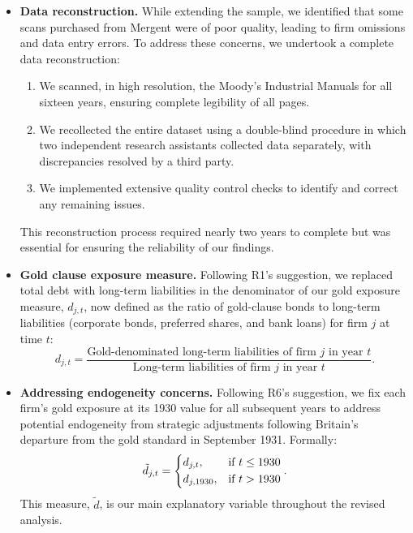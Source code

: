 \begin{itemize}
\item \textbf{Data reconstruction.} While extending the sample, we identified that some scans purchased from Mergent were of poor quality, leading to firm omissions and data entry errors. To address these concerns, we undertook a complete data reconstruction:
\begin{enumerate}
    \item We scanned, in high resolution, the Moody's Industrial Manuals for all sixteen years, ensuring complete legibility of all pages.
    \item We recollected the entire dataset using a double-blind procedure in which two independent research assistants collected data separately, with discrepancies resolved by a third party.
    \item We implemented extensive quality control checks to identify and correct any remaining issues.
\end{enumerate}
This reconstruction process required nearly two years to complete but was essential for ensuring the reliability of our findings.

\item \textbf{Gold clause exposure measure.} 
Following R1's suggestion, we replaced total debt with long-term liabilities in the denominator of our gold exposure measure, $d_{j,t}$, now defined as the ratio of gold-clause bonds to long-term liabilities (corporate bonds, preferred shares, and bank loans) for firm $j$ at time $t$:
\begin{equation*}
d_{j,t} = \frac{\text{Gold-denominated long-term liabilities of firm $j$ in year $t$}}{\text{Long-term liabilities of firm $j$ in year $t$}}.
\end{equation*}

\item \textbf{Addressing endogeneity concerns.} Following R6's suggestion, we fix each firm's gold exposure at its 1930 value for all subsequent years to address potential endogeneity from strategic adjustments following Britain's departure from the gold standard in September 1931. Formally:
\begin{equation*}
\tilde{d}_{j,t} = \begin{dcases}
d_{j,t}, & \text{if } t \leq 1930 \\
d_{j,1930}, & \text{if } t > 1930
\end{dcases}.
\end{equation*}
This measure, $\tilde{d}$, is our main explanatory variable throughout the revised analysis.


\end{itemize}
